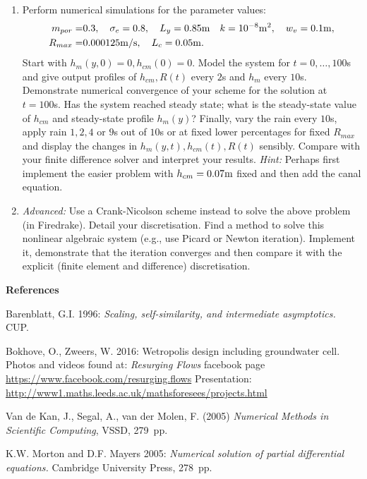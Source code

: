 \documentclass [12pt,english]{article}
\begin{document}
\begin{enumerate}
\item Perform numerical simulations for the parameter values:
\begin{align}
  m_{por} =&  0.3,\quad \sigma_e = 0.8,\quad
  L_y = 0.85{\rm m}\quad k = 10^{-8}{\rm m}^2,\quad w_v = 0.1{\rm m},\\ %
  R_{max} =& 0.000125{\rm m}/{\rm s},\quad L_c=0.05{\rm m}.
\end{align}
Start with $h_m(y,0)=0, h_{cm}(0)=0$.
Model the system for $t=0,\dots,100$s and give output profiles of $h_{cm}, R(t)$ every $2$s and $h_m$ every $10$s.
Demonstrate numerical convergence of your scheme for the solution at $t=100$s.
Has the system reached steady state; what is the steady-state value of $h_{cm}$ and steady-state profile $h_{m}(y)$?
Finally, vary the rain every $10$s, apply rain $1,2,4$ or $9$s out of $10$s or at fixed lower percentages for fixed $R_{max}$ 
and display the changes in $h_m(y,t), h_{cm}(t), R(t)$ sensibly.
Compare with your finite difference solver and interpret your results.
{\em Hint:} Perhaps first implement the easier problem with $h_{cm}=0.07{\rm m}$ fixed and then add the canal equation. 

\item {\em Advanced:} Use a Crank-Nicolson scheme instead to solve the above problem (in Firedrake). Detail your discretisation.
Find a method to solve this nonlinear algebraic system (e.g., use Picard or Newton iteration).
Implement it, demonstrate that the iteration converges and then
compare it with the explicit (finite element and difference) discretisation.
  

\end{enumerate}


\centerline{\bf References}

\noindent
Barenblatt, G.I. 1996: {\em Scaling, self-similarity, and intermediate asymptotics.} CUP. %

\noindent
Bokhove, O., Zweers, W. 2016: Wetropolis design including groundwater cell. Photos and videos found at:
{\em Resurging Flows} facebook page \url{https://www.facebook.com/resurging.flows}
Presentation: \url{http://www1.maths.leeds.ac.uk/mathsforesees/projects.html}

\noindent
Van de Kan, J., Segal, A., van der Molen, F. (2005)
{\em Numerical Methods in Scientific Computing}, VSSD, 279~pp.

\noindent
K.W. Morton and D.F. Mayers 2005:
{\em Numerical solution of partial differential equations.} Cambridge University Press, 278~pp.
\end{document}
